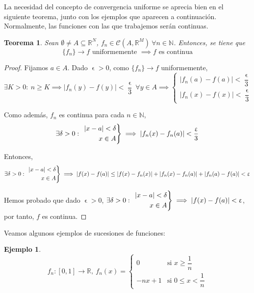 \documentclass[11pt, a4paper]{article}
\let\epsilon\upvarepsilon
\providecommand{\abs}[1]{\lvert#1\rvert}
\newcommand{\R}{\mathbb{R}}
\newcommand{\N}{\mathbb{N}}
\newcommand{\fn}{\{f_n\}}
\theoremstyle{theorem-style}
\newtheorem{nth}{Teorema}[section]
\theoremstyle{definition-style}
\theoremstyle{remark-style}
\theoremstyle{example-style}
\newtheorem{ejemplo}{Ejemplo}[section]
\newenvironment{rcases}
{\left.\begin{aligned}}
    {\end{aligned}\right\rbrace}
\begin{document}
La necesidad del concepto de convergencia uniforme se aprecia bien en el siguiente teorema, junto con los ejemplos que aparecen a continuación. Normalmente, las funciones con las que trabajemos serán continuas.

\begin{nth}
  \label{2}
  Sean $\emptyset \ne A \subseteq \R^N$, $f_n \in \mathcal{C}(A,\R^M)\ \forall n\in \N$. Entonces, se tiene que
  \[
    \fn \to f \text{ uniformemente } \implies f \text{ es continua}
  \]
\end{nth}

\begin{proof}
  Fijamos $a\in A$. Dado $\epsilon>0$, como $\fn\to f$ uniformemente,
  \[
    \exists K>0:\ n\ge K \implies \abs{f_n(y)-f(y)}<\dfrac{\epsilon}{3}\ \forall y\in A \implies \begin{cases}
      \abs{f_n(a)-f(a)}<\dfrac{\epsilon}{3}\\
      \abs{f_n(x)-f(x)}<\dfrac{\epsilon}{3}
    \end{cases}
  \]
  
  Como además, $f_n$ es continua para cada $n\in \N$,
  \[
    \exists \delta>0:\ \begin{rcases}
      \abs{x-a}<\delta\\
      x\in A
    \end{rcases} \implies \abs{f_n(x)-f_n(a)} < \dfrac{\epsilon}{3}
  \] 
  
  Entonces,
  \[
    \exists \delta>0:\ \begin{rcases}
      \abs{x-a}<\delta\\
      x\in A
    \end{rcases} \implies \abs{f(x)-f(a)} \le \abs{f(x)-f_n(x)} + \abs{f_n(x)-f_n(a)}+\abs{f_n(a)-f(a)} < \epsilon
  \]
  
  Hemos probado que dado $\epsilon > 0$, $\exists \delta>0:\ \begin{rcases}
    \abs{x-a}<\delta\\
    x\in A
  \end{rcases} \implies \abs{f(x)-f(a)}<\epsilon$, por tanto, $f$ es continua. 
\end{proof}

Veamos algunoss ejemplos de sucesiones de funciones:

\begin{ejemplo}
  \[
    f_n : [0,1] \to \R,\ f_n(x) = \begin{cases}
      0 & \text{si } x\ge \dfrac{1}{n}\\
      -nx+1 & \text{si } 0\le x < \dfrac{1}{n}
    \end{cases}
  \]
\end{ejemplo}
\end{document}
